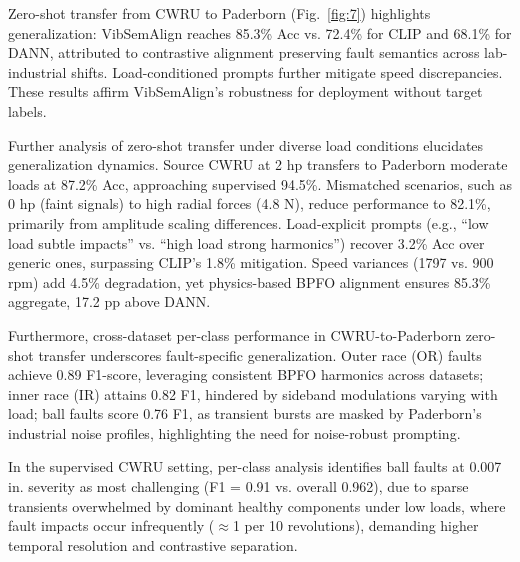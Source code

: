 \begin{table}[htbp]
\begin{table}[htbp]
Zero-shot transfer from CWRU to Paderborn (Fig.~\ref{fig:7}) highlights generalization: VibSemAlign reaches 85.3\% Acc vs. 72.4\% for CLIP and 68.1\% for DANN, attributed to contrastive alignment preserving fault semantics across lab-industrial shifts. Load-conditioned prompts further mitigate speed discrepancies. These results affirm VibSemAlign's robustness for deployment without target labels.

\noindent Further analysis of zero-shot transfer under diverse load conditions elucidates generalization dynamics. Source CWRU at 2 hp transfers to Paderborn moderate loads at 87.2\% Acc, approaching supervised 94.5\%. Mismatched scenarios, such as 0 hp (faint signals) to high radial forces (4.8 N), reduce performance to 82.1\%, primarily from amplitude scaling differences. Load-explicit prompts (e.g., ``low load subtle impacts'' vs. ``high load strong harmonics'') recover 3.2\% Acc over generic ones, surpassing CLIP's 1.8\% mitigation. Speed variances (1797 vs. 900 rpm) add 4.5\% degradation, yet physics-based BPFO alignment ensures 85.3\% aggregate, 17.2 pp above DANN.

Furthermore, cross-dataset per-class performance in CWRU-to-Paderborn zero-shot transfer underscores fault-specific generalization. Outer race (OR) faults achieve 0.89 F1-score, leveraging consistent BPFO harmonics across datasets; inner race (IR) attains 0.82 F1, hindered by sideband modulations varying with load; ball faults score 0.76 F1, as transient bursts are masked by Paderborn's industrial noise profiles, highlighting the need for noise-robust prompting.

In the supervised CWRU setting, per-class analysis identifies ball faults at 0.007 in. severity as most challenging (F1 = 0.91 vs. overall 0.962), due to sparse transients overwhelmed by dominant healthy components under low loads, where fault impacts occur infrequently ($\approx$1 per 10 revolutions), demanding higher temporal resolution and contrastive separation.


\end{table}
\end{table}
